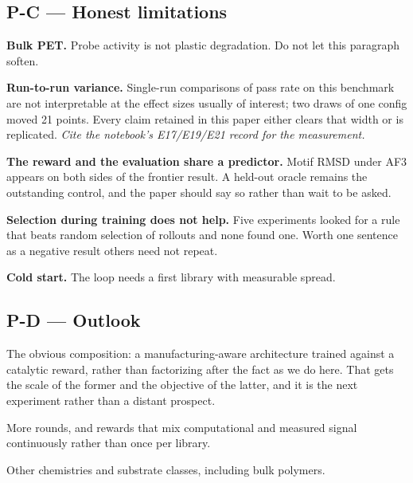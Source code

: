 \subsection*{P-C --- Honest limitations}
\begin{planlist}
  \item \textbf{Bulk PET.} Probe activity is not plastic degradation. Do not let
        this paragraph soften.
  \item \textbf{Run-to-run variance.} Single-run comparisons of pass rate on
        this benchmark are not interpretable at the effect sizes usually of
        interest; two draws of one config moved 21 points. Every claim retained
        in this paper either clears that width or is replicated. \emph{Cite the
        notebook's E17/E19/E21 record for the measurement.}
  \item \textbf{The reward and the evaluation share a predictor.} Motif RMSD
        under AF3 appears on both sides of the frontier result. A held-out
        oracle remains the outstanding control, and the paper should say so
        rather than wait to be asked.
  \item \textbf{Selection during training does not help.} Five experiments
        looked for a rule that beats random selection of rollouts and none
        found one. Worth one sentence as a negative result others need not
        repeat.
  \item \textbf{Cold start.} The loop needs a first library with measurable
        spread.
\end{planlist}

\subsection*{P-D --- Outlook}
\begin{planlist}
  \item The obvious composition: a manufacturing-aware architecture
        \citep{weinstein2026manufacturing} trained against a catalytic reward,
        rather than factorizing after the fact as we do here. That gets the
        scale of the former and the objective of the latter, and it is the next
        experiment rather than a distant prospect.
  \item More rounds, and rewards that mix computational and measured signal
        continuously rather than once per library.
  \item Other chemistries and substrate classes, including bulk polymers.
\end{planlist}
